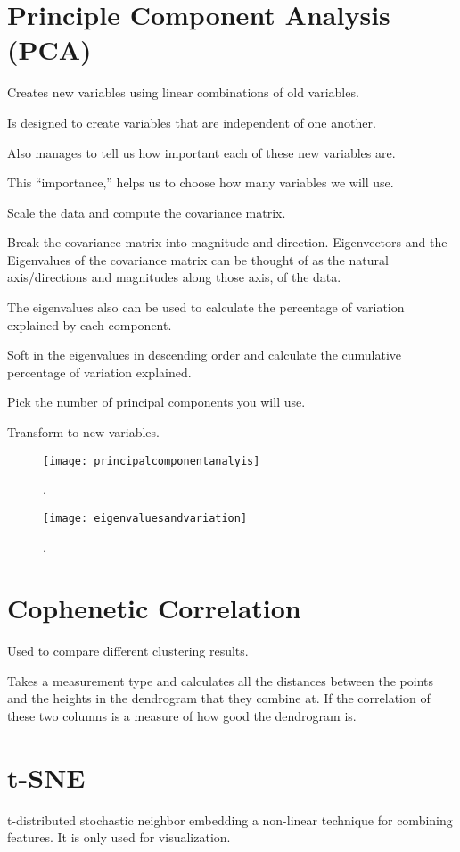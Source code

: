 	\section{Principle Component Analysis (PCA)}
	\begin{bulletedlist}
		\item Creates new variables using linear combinations of old variables.
		\item Is designed to create variables that are independent of one another.
		\item Also manages to tell us how important each of these new variables are.
		\item This ``importance,'' helps us to choose how many variables we will use.
		\item Scale the data and compute the covariance matrix.
		\item Break the covariance matrix into magnitude and direction. Eigenvectors and the Eigenvalues of the covariance matrix can be thought of as the natural axis/directions and magnitudes along those axis, of the data.
		\begin{bulletedlist}
			\item The eigenvalues also can be used to calculate the percentage of variation explained by each component.
		\end{bulletedlist}
		\item Soft in the eigenvalues in descending order and calculate the cumulative percentage of variation explained.
		\item Pick the number of principal components you will use.
		\item Transform to new variables.
	\end{bulletedlist}

	\begin{figure}[h]
		\centering
		\texttt{[image: principalcomponentanalyis]}
		\caption{.}
		\label{fig:principalcomponentanalyis}
	\end{figure}
 	\begin{figure}[h]
		\centering
		\texttt{[image: eigenvaluesandvariation]}
		\caption{.}
		\label{fig:eigenvaluesandvariation}
	\end{figure}

	\section{Cophenetic Correlation}
Used to compare different clustering results.

Takes a measurement type and calculates all the distances between the points and the heights in the dendrogram that they combine at.  If the correlation of these two columns is a measure of how good the dendrogram is.

	\section{t-SNE}
t-distributed stochastic neighbor embedding a non-linear technique for combining features.  It is only used for visualization. 